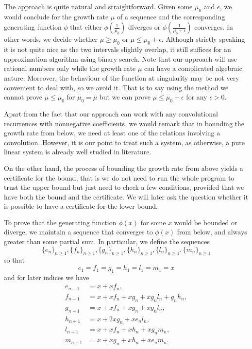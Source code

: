 \documentclass[a4paper,12pt]{article}
\begin{document}
The approach is quite natural and straightforward. Given some $\mu_0$ and $\epsilon$, we would conclude for the growth rate $\mu$ of a sequence and the corresponding generating function $\phi$ that either $\phi(\frac{1}{\mu_0})$ diverges or $\phi(\frac{1}{\mu_0+\epsilon})$ converges. In other words, we decide whether $\mu\ge \mu_0$ or $\mu \le \mu_0+\epsilon$. Although strictly speaking it is not quite nice as the two intervals slightly overlap, it still suffices for an approximation algorithm using binary search. Note that our approach will use rational numbers only while the growth rate $\mu$ can have a complicated algebraic nature. Moreover, the behaviour of the function at singularity may be not very convenient to deal with, so we avoid it. That is to say using the method we cannot prove $\mu\le \mu_0$ for $\mu_0=\mu$ but we can prove $\mu\le \mu_0+\epsilon$ for any $\epsilon>0$. 

Apart from the fact that our approach can work with any convolutional recurrences with nonnegative coefficients, we would remark that in bounding the growth rate from below, we need at least one of the relations involving a convolution. However, it is our point to treat such a system, as otherwise, a pure linear system is already well studied in literature.

On the other hand, the process of bounding the growth rate from above yields a certificate for the bound, that is we do not need to run the whole program to trust the upper bound but just need to check a few conditions, provided that we have both the bound and the certificate. We will later ask the question whether it is possible to have a certificate for the lower bound.

To prove that the generating function $\phi(x)$ for some $x$ would be bounded or diverge, we maintain a sequence that converges to $\phi(x)$ from below, and always greater than some partial sum. In particular, we define the sequences
\[
\{e_n\}_{n\ge 1}, \{f_n\}_{n\ge 1},\{g_n\}_{n\ge 1},\{h_n\}_{n\ge 1},\{l_n\}_{n\ge 1},\{m_n\}_{n\ge 1}
\]
so that
\[
	e_1=f_1=g_1=h_1=l_1=m_1=x
\]
and for later indices we have
\begin{align*}
	e_{n+1} &= x + x f_n, \\
	f_{n+1} &= x + x f_n + x g_n + x g_n l_n + g_n h_n, \\
	g_{n+1} &= x + x f_n + x g_n + x g_n l_n, \\
	h_{n+1} &= x + 2x g_n + x e_n l_n, \\
	l_{n+1} &= x + x f_n + x h_n + x g_n m_n, \\
	m_{n+1} &= x + x g_n + x h_n + x e_n m_n.
\end{align*}
\end{document}
